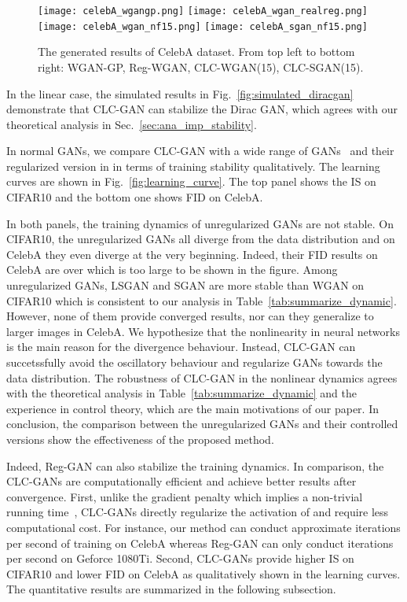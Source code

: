 \documentclass{article}
\newcommand{\fig}[1]{Fig.~\ref{fig:#1}}
\newcommand{\tabl}[1]{Table~\ref{tab:#1}}
\newcommand{\secref}[1]{Sec.~\ref{sec:#1}} \usepackage{wrapfig}
\theoremstyle{definition}
\begin{document}
\begin{figure}[t]
	\centering
	\texttt{[image: celebA\_wgangp.png]}
	\texttt{[image: celebA\_wgan\_realreg.png]}
	\texttt{[image: celebA\_wgan\_nf15.png]}
	\texttt{[image: celebA\_sgan\_nf15.png]}
\caption{The generated results of CelebA dataset. From top left to bottom right: WGAN-GP, Reg-WGAN, CLC-WGAN(15), CLC-SGAN(15).}
\label{fig:celeba_generation}
\end{figure}

In the linear case, the simulated results in \fig{simulated_diracgan} demonstrate that CLC-GAN can stabilize the Dirac GAN, which agrees with our theoretical analysis in \secref{ana_imp_stability}. 

In normal GANs, we compare CLC-GAN with a wide range of GANs~\cite{arjovsky2017wasserstein,goodfellow2014generative,mao2017least,miyato2018spectral} and their regularized version in \cite{mescheder2018training} in terms of training stability qualitatively.
The learning curves are shown in \fig{learning_curve}. The top panel shows the IS on CIFAR10 and the bottom one shows FID on CelebA.

In both panels, the training dynamics of unregularized GANs are not stable. On CIFAR10, the unregularized GANs all diverge from the data distribution and on CelebA they even diverge at the very beginning.
Indeed, their FID results on CelebA are over  which is too large to be shown in the figure. 
Among unregularized GANs, LSGAN and SGAN are more stable than WGAN on CIFAR10 which is consistent to our analysis in \tabl{summarize_dynamic}.
However, none of them provide converged results, nor can they generalize to larger images in CelebA.
We hypothesize that the nonlinearity in neural networks is the main reason for the divergence behaviour.
Instead, CLC-GAN can succetssfully avoid the oscillatory behaviour and regularize GANs towards the data distribution. 
The robustness of CLC-GAN in the nonlinear dynamics agrees with the theoretical analysis in \tabl{summarize_dynamic} and the experience in control theory, which are the main motivations of our paper.
In conclusion, the comparison between the unregularized GANs and their controlled versions show the effectiveness of the proposed method.


Indeed, Reg-GAN can also stabilize the training dynamics.
In comparison, the CLC-GANs are computationally efficient and achieve better results after convergence.
First, unlike the gradient penalty which implies a non-trivial running time~\cite{kurach2018large}, CLC-GANs directly regularize the activation of  and require less computational cost.
For instance, our method can conduct approximate  iterations per second of training on CelebA whereas Reg-GAN can only conduct  iterations per second on Geforce 1080Ti. 
Second, CLC-GANs provide higher IS on CIFAR10 and lower FID on CelebA as qualitatively shown in the learning curves. The quantitative results are summarized in the following subsection.
\end{document}

